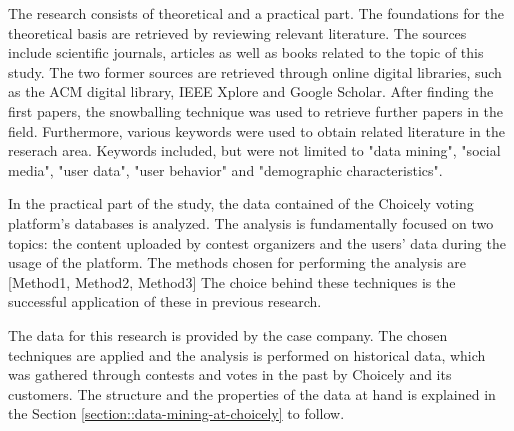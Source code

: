     The research consists of theoretical and a practical part. The foundations for the theoretical basis are retrieved by reviewing relevant literature. The sources include scientific journals, articles as well as books related to the topic of this study. The two former sources are retrieved through online digital libraries, such as the ACM digital library, IEEE Xplore and Google Scholar. After finding the first papers, the snowballing technique was used to retrieve further papers in the field. Furthermore, various keywords were used to obtain related literature in the reserach area. Keywords included, but were not limited to "data mining", "social media", "user data", "user behavior" and "demographic characteristics". 
    
    In the practical part of the study, the data contained of the Choicely voting platform's databases is analyzed. The analysis is fundamentally focused on two topics: the content uploaded by contest organizers and the users' data during the usage of the platform. The methods chosen for performing the analysis are [Method1, Method2, Method3] %
    The choice behind these techniques is the successful application of these in previous research. 

    The data for this research is provided by the case company. The chosen techniques are applied and the analysis is performed on historical data, which was gathered through contests and votes in the past by Choicely and its customers. The structure and the properties of the data at hand is explained in the Section \ref{section::data-mining-at-choicely} to follow.
    

